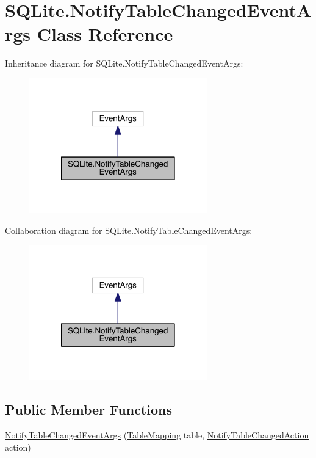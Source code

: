 \hypertarget{class_s_q_lite_1_1_notify_table_changed_event_args}{\section{S\+Q\+Lite.\+Notify\+Table\+Changed\+Event\+Args Class Reference}
\label{class_s_q_lite_1_1_notify_table_changed_event_args}
}


Inheritance diagram for S\+Q\+Lite.\+Notify\+Table\+Changed\+Event\+Args\+:
\nopagebreak
\begin{figure}[H]
\begin{center}
\leavevmode
\includegraphics[width=218pt]{class_s_q_lite_1_1_notify_table_changed_event_args__inherit__graph}
\end{center}
\end{figure}


Collaboration diagram for S\+Q\+Lite.\+Notify\+Table\+Changed\+Event\+Args\+:
\nopagebreak
\begin{figure}[H]
\begin{center}
\leavevmode
\includegraphics[width=218pt]{class_s_q_lite_1_1_notify_table_changed_event_args__coll__graph}
\end{center}
\end{figure}
\subsection*{Public Member Functions}
\begin{DoxyCompactItemize}
\item 
\hyperlink{class_s_q_lite_1_1_notify_table_changed_event_args_a530778550d4332cd4cfcd10aa1267600}{Notify\+Table\+Changed\+Event\+Args} (\hyperlink{class_s_q_lite_1_1_table_mapping}{Table\+Mapping} table, \hyperlink{namespace_s_q_lite_a75ed4e953251d63b64b7660b64e2cc65}{Notify\+Table\+Changed\+Action} action)
\end{DoxyCompactItemize}
